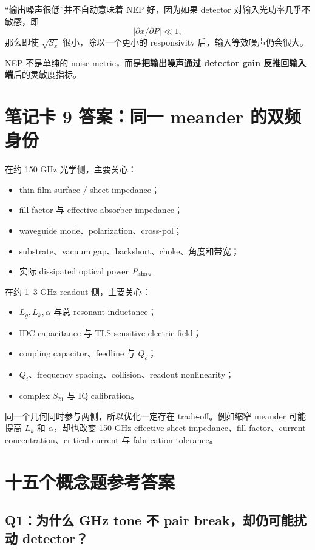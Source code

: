 \documentclass[11pt,a4paper,openany]{ctexrep}
\begin{document}
“输出噪声很低”并不自动意味着 NEP 好，因为如果 detector 对输入光功率几乎不敏感，即
\[
|\partial x/\partial P|\ll1,
\]
那么即使 $\sqrt{S_x}$ 很小，除以一个更小的 responsivity 后，输入等效噪声仍会很大。

\begin{answerbox}[title=一句话]
NEP 不是单纯的 noise metric，而是\textbf{把输出噪声通过 detector gain 反推回输入端}后的灵敏度指标。
\end{answerbox}

\section{笔记卡 9 答案：同一 meander 的双频身份}

在约 150 GHz 光学侧，主要关心：
\begin{itemize}
  \item thin-film surface / sheet impedance；
  \item fill factor 与 effective absorber impedance；
  \item waveguide mode、polarization、cross-pol；
  \item substrate、vacuum gap、backshort、choke、角度和带宽；
  \item 实际 dissipated optical power $P_{\rm abs}$。
\end{itemize}

在约 1--3 GHz readout 侧，主要关心：
\begin{itemize}
  \item $L_g,L_k,\alpha$ 与总 resonant inductance；
  \item IDC capacitance 与 TLS-sensitive electric field；
  \item coupling capacitor、feedline 与 $Q_c$；
  \item $Q_i$、frequency spacing、collision、readout nonlinearity；
  \item complex $S_{21}$ 与 IQ calibration。
\end{itemize}

同一个几何同时参与两侧，所以优化一定存在 trade-off。例如缩窄 meander 可能提高 $L_k$ 和 $\alpha$，却也改变 150 GHz effective sheet impedance、fill factor、current concentration、critical current 与 fabrication tolerance。

\section{十五个概念题参考答案}

\subsection*{Q1：为什么 GHz tone 不 pair break，却仍可能扰动 detector？}
\end{document}
